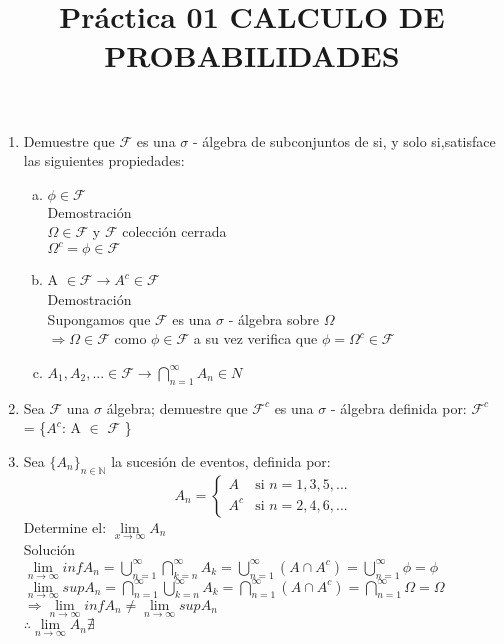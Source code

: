 \documentclass[12pt]{article}
\title{\textbf{Práctica 01 CALCULO DE PROBABILIDADES}}
\date{}
\begin{document}
\maketitle
\begin{enumerate}
\item  Demuestre que $\mathcal{F}$ es una $\sigma$ - álgebra de subconjuntos de si, y solo si,satisface las siguientes propiedades:
\begin{enumerate}[a)]

\item $\phi \in \mathcal{F}$\\[0.2cm]
Demostración\\[0.2cm]
$\Omega \in \mathcal{F}$ y $ \mathcal{F}$ colección cerrada\\[0.2cm]
$\Omega^c = \phi\in\mathcal{F}$\\[0.2cm]

\item A $\in \mathcal{F}\longrightarrow A^{c} \in\mathcal{F}$\\[0.2cm]
Demostración\\[0.2cm]
Supongamos que $\mathcal{F}$ es una $\sigma$ - álgebra sobre $\Omega$\\[0.2cm]
$\Rightarrow \Omega \in\mathcal{F}$ como $\phi \in \mathcal{F}$ a su vez verifica que $\phi= {\Omega^c} \in  \mathcal{F}$

\item $A_1,A_2,... \in \mathcal{F} \longrightarrow\displaystyle\bigcap_{n=1}^{\infty}{A_n \in N}$\\[0.2cm]

\end{enumerate}

\item Sea $\mathcal{F}$ una $\sigma$ álgebra; demuestre que $\mathcal{F}^c$ es una $\sigma$ - álgebra definida por: $\mathcal{F}^c$ = \{$A^c$: A $\in$ $\mathcal{F}$ \}

\item Sea $\{A_n\}_{n\in\mathbb{N}}$ la sucesión de eventos, definida por:
\[A_n = \begin{cases} 
      A  & \mbox{si } n= 1,3,5,...        \\[0.5cm]
      A^c  & \mbox{si } n = 2,4,6,...
 \end{cases} \]
Determine el: $\lim\limits_{x \to \infty}A_n$\\[0.2cm]
Solución\\[0.2cm]
$\lim\limits_{n \to \infty}{inf}A_n =\displaystyle\bigcup_{n=1}^{\infty}\displaystyle\bigcap_{k=n}^{\infty}A_k = \displaystyle\bigcup_{n=1}^{\infty}\left(A \cap A^c\right)= \displaystyle\bigcup_{n=1}^{\infty}\phi = \phi $\\[0.2cm]
$\lim\limits_{n \to \infty}{sup}A_n= \displaystyle\bigcap_{n=1}^{\infty}\displaystyle\bigcup_{k=n}^{\infty}A_k = \displaystyle\bigcap_{n=1}^{\infty}\left(A \cap A^c\right)= \displaystyle\bigcap_{n=1}^{\infty}\Omega = \Omega $\\[0.2cm]
$\Rightarrow \lim\limits_{n \to \infty}{inf}A_n \not = \lim\limits_{n \to \infty}{sup}A_n $\\[0.2cm]
$\therefore \lim\limits_{n \to \infty}A_n \nexists$




\end{enumerate}
\end{document}
